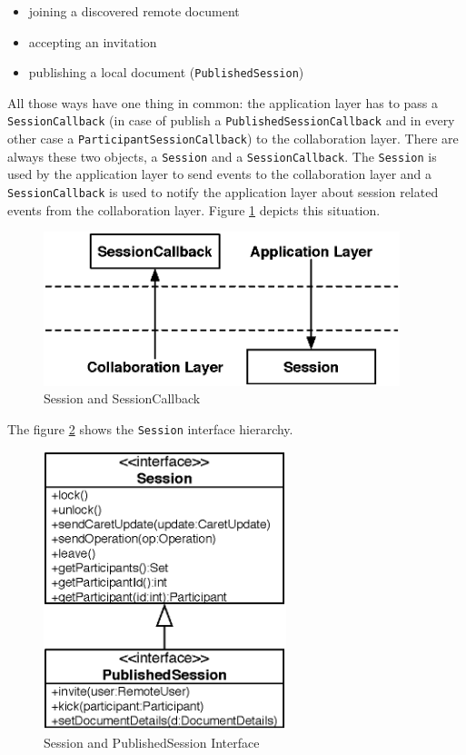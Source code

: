 \begin{itemize}
 \item joining a discovered remote document
 \item accepting an invitation
 \item publishing a local document (\texttt{PublishedSession})
\end{itemize}

All those ways have one thing in common: the application layer has to pass a 
\texttt{Session\-Callback}
(in case of publish a \texttt{Published\-Session\-Callback} and in every
other case a \texttt{Participant\-Session\-Callback}) to the collaboration
layer. There are always these two objects, a \texttt{Session} and
a \texttt{Session\-Callback}. The \texttt{Session} is used by the application
layer to send events to the collaboration layer and a \texttt{Session\-Callback}
is used to notify the application layer about session related events from the 
collaboration layer. Figure \ref{fig:archoverview.sessionandcallback} depicts 
this situation.

\begin{figure}[H]
 \centering
 \includegraphics[width=10.37cm,height=4.48cm]{../images/finalreport/architecture_session_sessioncallback.eps}
 \caption{Session and SessionCallback}
 \label{fig:archoverview.sessionandcallback}
\end{figure}

The figure \ref{fig:archoverview.session} shows the \texttt{Session} interface
hierarchy.

\begin{figure}[H]
 \centering
 \includegraphics[width=7.06cm,height=8.11cm]{../images/finalreport/architecture_session_uml.eps}
 \caption{Session and PublishedSession Interface}
 \label{fig:archoverview.session}
\end{figure}


